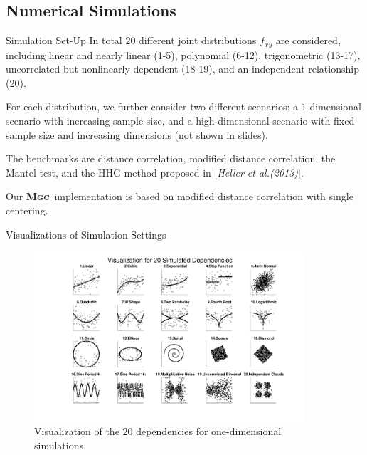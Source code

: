 \documentclass{beamer}
\providecommand{\sct}[1]{{\normalfont\textsc{#1}}}
\newcommand{\Mgc}{\textbf{\sct{Mgc}}}
\begin{document}
\subsection{Numerical Simulations}
\begin{frame}{Simulation Set-Up}
In total $20$ different joint distributions $f_{xy}$ are considered, including linear and nearly linear  (1-5), polynomial   (6-12), trigonometric (13-17), uncorrelated but nonlinearly dependent  (18-19), and an independent relationship (20).

\pause
\medskip
For each distribution, we further consider two different scenarios: a $1$-dimensional scenario with increasing sample size, and a high-dimensional scenario with fixed sample size and increasing dimensions (not shown in slides).

\pause
\medskip
The benchmarks are distance correlation, modified distance correlation, the Mantel test, and the HHG method proposed in [\textit{Heller et al.(2013)}]\cite{HellerGorfine2013}.

\pause
\medskip
Our \Mgc~implementation is based on modified distance correlation with single centering.
\end{frame}

\begin{frame}{Visualizations of Simulation Settings}
\begin{figure}[ht]
  \centering
  \includegraphics[width=0.9\textwidth]{../Figures/FigSimVisual}
	\caption{Visualization of the $20$ dependencies for one-dimensional simulations. 
}
	\label{f:dependencies}
\end{figure}
\end{frame}
\end{document}
